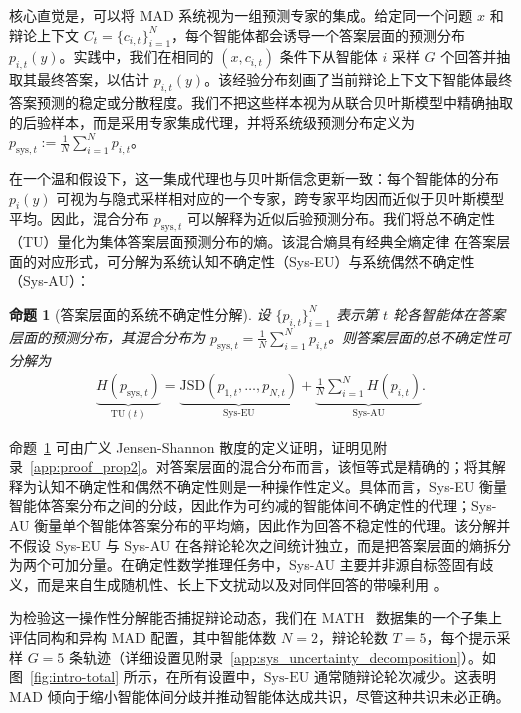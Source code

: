 \documentclass{article}
\theoremstyle{plain}
\newtheorem{proposition}[theorem]{命题}
\theoremstyle{definition}
\theoremstyle{remark}
\begin{document}
核心直觉是，可以将 MAD 系统视为一组预测专家的集成。给定同一个问题 $x$ 和辩论上下文 $C_t=\{c_{i,t}\}_{i=1}^N$，每个智能体都会诱导一个答案层面的预测分布 $p_{i,t}(y)$。实践中，我们在相同的 $(x,c_{i,t})$ 条件下从智能体 $i$ 采样 $G$ 个回答并抽取其最终答案，以估计 $p_{i,t}(y)$。该经验分布刻画了当前辩论上下文下智能体最终答案预测的稳定或分散程度。我们不把这些样本视为从联合贝叶斯模型中精确抽取的后验样本，而是采用专家集成代理，并将系统级预测分布定义为 $p_{\mathrm{sys},t}:=\frac{1}{N}\sum_{i=1}^N p_{i,t}$。

在一个温和假设下，这一集成代理也与贝叶斯信念更新一致：每个智能体的分布 $p_i(y)$ 可视为与隐式采样相对应的一个专家，跨专家平均因而近似于贝叶斯模型平均。因此，混合分布 $p_{\mathrm{sys},t}$ 可以解释为近似后验预测分布。我们将总不确定性（TU）量化为集体答案层面预测分布的熵。该混合熵具有经典全熵定律 \cite{lakshminarayanan2017simple} 在答案层面的对应形式，可分解为系统认知不确定性（Sys-EU）与系统偶然不确定性（Sys-AU）：


\begin{proposition}[答案层面的系统不确定性分解]\label{prop:sys_decomp}
设 $\{p_{i,t}\}_{i=1}^N$ 表示第 $t$ 轮各智能体在答案层面的预测分布，其混合分布为
$p_{\mathrm{sys},t}=\frac{1}{N}\sum_{i=1}^N p_{i,t}$。则答案层面的总不确定性可分解为
\begin{align}
\underbrace{H(p_{\mathrm{sys},t})}_{\mathrm{TU}(t)}= 
\underbrace{\mathrm{JSD}(p_{1,t},\ldots,p_{N,t})}_{\mathrm{Sys\mbox{-}EU}}
+
\underbrace{\frac{1}{N}\sum_{i=1}^N H(p_{i,t})}_{\mathrm{Sys\mbox{-}AU}}.
\label{eq:sys_decomp}
\end{align}
\end{proposition}


命题~\ref{prop:sys_decomp} 可由广义 Jensen-Shannon 散度的定义证明，证明见附录~\ref{app:proof_prop2}。对答案层面的混合分布而言，该恒等式是精确的；将其解释为认知不确定性和偶然不确定性则是一种操作性定义。具体而言，Sys-EU 衡量智能体答案分布之间的分歧，因此作为可约减的智能体间不确定性的代理；Sys-AU 衡量单个智能体答案分布的平均熵，因此作为回答不稳定性的代理。该分解并不假设 Sys-EU 与 Sys-AU 在各辩论轮次之间统计独立，而是把答案层面的熵拆分为两个可加分量。在确定性数学推理任务中，Sys-AU 主要并非源自标签固有歧义，而是来自生成随机性、长上下文扰动以及对同伴回答的带噪利用 \cite{feng2025rethinking, ling2024uncertainty}。


为检验这一操作性分解能否捕捉辩论动态，我们在 MATH~\cite{hendrycks2021measuring} 数据集的一个子集上评估同构和异构 MAD 配置，其中智能体数 $N=2$，辩论轮数 $T=5$，每个提示采样 $G=5$ 条轨迹（详细设置见附录~\ref{app:sys_uncertainty_decomposition}）。如图~\ref{fig:intro-total} 所示，在所有设置中，$\mathrm{Sys\mbox{-}EU}$ 通常随辩论轮次减少。这表明 MAD 倾向于缩小智能体间分歧并推动智能体达成共识，尽管这种共识未必正确。
\end{document}

